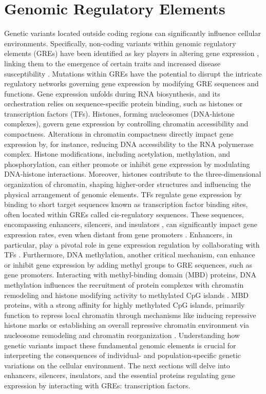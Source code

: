\documentclass[a4paper, titlepage, openright]{book}
\newcommand{\mychapter}[2]{
    \setcounter{chapter}{#1}
    \setcounter{section}{0}
    \chapter*{#2}
    \addcontentsline{toc}{chapter}{#2}
}
\begin{document}
\mychapter{4}{Genomic Regulatory Elements}
Genetic variants located outside coding regions can significantly influence cellular environments. Specifically, non-coding variants within genomic regulatory elements (GREs) have been identified as key players in altering gene expression \citep{de2006regulatory,wienert2015editing}, linking them to the emergence of certain traits and increased disease susceptibility \citep{weinhold2014genome}. Mutations within GREs have the potential to disrupt the intricate regulatory networks governing gene expression by modifying GRE sequences and functions. Gene expression unfolds during RNA biosynthesis, and its orchestration relies on sequence-specific protein binding, such as histones or transcription factors (TFs). Histones, forming nucleosomes (DNA-histone complexes), govern gene expression by controlling chromatin accessibility and compactness. Alterations in chromatin compactness directly impact gene expression by, for instance, reducing DNA accessibility to the RNA polymerase complex. Histone modifications, including acetylation, methylation, and phosphorylation, can either promote or inhibit gene expression by modulating DNA-histone interactions. Moreover, histones contribute to the three-dimensional organization of chromatin, shaping higher-order structures and influencing the physical arrangement of genomic elements. TFs regulate gene expression by binding to short target sequences known as transcription factor binding sites, often located within GREs called cis-regulatory sequences. These sequences, encompassing enhancers, silencers, and insulators \citep{kolovos2012enhancers}, can significantly impact gene expression rates, even when distant from gene promoters \citep{wittkopp2012cis}. Enhancers, in particular, play a pivotal role in gene expression regulation by collaborating with TFs \citep{spitz2012transcription}. Furthermore, DNA methylation, another critical mechanism, can enhance or inhibit gene expression by adding methyl groups to GRE sequences, such as gene promoters. Interacting with methyl-binding domain (MBD) proteins, DNA methylation influences the recruitment of protein complexes with chromatin remodeling and histone modifying activity to methylated CpG islands \citep{du2015methyl}. MBD proteins, with a strong affinity for highly methylated CpG islands, primarily function to repress local chromatin through mechanisms like inducing repressive histone marks or establishing an overall repressive chromatin environment via nucleosome remodeling and chromatin reorganization \citep{du2015methyl}. Understanding how genetic variants impact these fundamental genomic elements is crucial for interpreting the consequences of individual- and population-specific genetic variations on the cellular environment. The next sections will delve into enhancers, silencers, insulators, and the essential proteins regulating gene expression by interacting with GREs: transcription factors.
\end{document}
